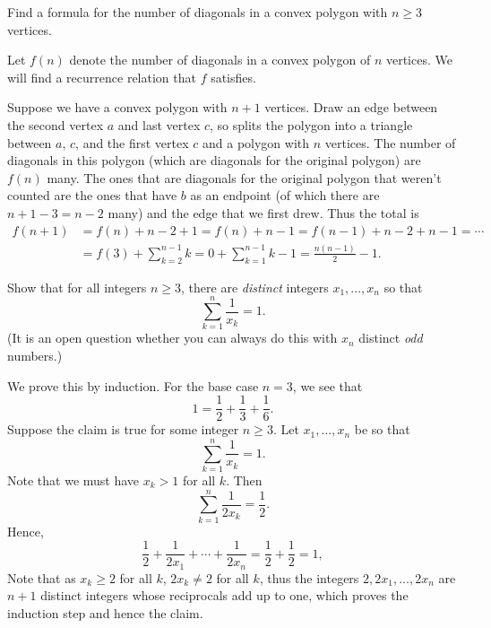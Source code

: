 \documentclass[11pt,dvipsnames]{book}
\numberwithin{figure}{section} %
\numberwithin{table}{section} %
\begin{document}
\begin{exercise}
Find a formula for the number of diagonals in a convex polygon with $n\geq 3$ vertices.
\begin{solution}
Let $f(n)$ denote the number of diagonals in a convex polygon of $n$ vertices. We will find a recurrence relation that $f$ satisfies.

Suppose we have a convex  polygon with $n+1$ vertices. Draw an edge between the second vertex $a$ and last vertex $c$, so splits the polygon into a triangle between $a$, $c$, and the first vertex $c$ and a polygon with $n$ vertices. The number of diagonals in this polygon (which are diagonals for the original polygon) are $f(n)$ many. The ones that are diagonals for the original polygon that weren't counted are the ones that have $b$ as an endpoint (of which there are $n+1-3=n-2$ many) and the edge that we first drew. Thus the total is
\begin{align*}
f(n+1)
& =f(n)+n-2+1=f(n)+n-1  = f(n-1) + n-2+n-1=\cdots \\
& = f(3) + \sum_{k=2}^{n-1}k
=0+\sum_{k=1}^{n-1}k-1 = \frac{n(n-1)}{2}-1.
\end{align*}
\end{solution}
\end{exercise}

\begin{exercise}
Show that for all integers $n\geq 3$, there are {\it distinct} integers $x_{1},...,x_{n}$ so that
\[
\sum_{k=1}^{n} \frac{1}{x_{k}}=1.
\]
(It is an open question whether you can always do this with $x_{n}$ distinct {\it odd} numbers.)
\begin{solution}
We prove this by induction. For the base case $n=3$, we see that
\[
1=\frac{1}{2}+\frac{1}{3}+\frac{1}{6}.
\]
 Suppose the claim is true for some integer $n\geq 3$. Let $x_{1},...,x_{n}$ be so that
\[
\sum_{k=1}^{n} \frac{1}{x_{k}}=1.
\]
Note that we must have $x_{k}>1$ for all $k$. Then
\[
\sum_{k=1}^{n} \frac{1}{2x_{k}}=\frac{1}{2}.
\]
Hence,
\[
\frac{1}{2} + \frac{1}{2x_{1}}+\cdots + \frac{1}{2x_{n}}=\frac{1}{2}+\frac{1}{2} =1,
\]
Note that as $x_{k}\geq 2$ for all $k$, $2x_{k}\neq 2$ for all $k$, thus the integers $2,2x_{1},...,2x_{n}$ are $n+1$ distinct integers whose reciprocals add up to one, which proves the induction step and hence the claim.
\end{solution}
\end{exercise}
\end{document}
